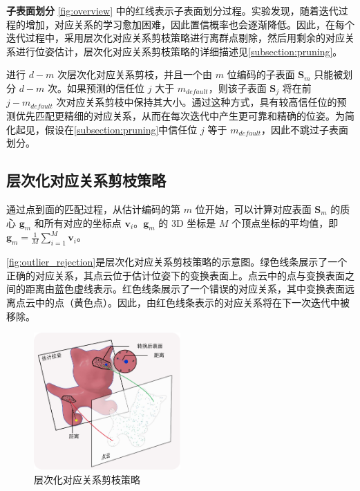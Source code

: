 \textbf{子表面划分} \autoref{fig:overview} 中的红线表示子表面划分过程。实验发现，随着迭代过程的增加，对应关系的学习愈加困难，因此置信概率也会逐渐降低。因此，在每个迭代过程中，采用层次化对应关系剪枝策略进行离群点剔除，然后用剩余的对应关系进行位姿估计，层次化对应关系剪枝策略的详细描述见\autoref{subsection:pruning}。

进行 $d - m$ 次层次化对应关系剪枝，并且一个由 $m$ 位编码的子表面 $\bm{S}_m$ 只能被划分 $d - m$ 次。如果预测的信任位 $j$ 大于 $m_{default}$，则该子表面 $\bm{S}_j$ 将在前 $j - m_{default}$ 次对应关系剪枝中保持其大小。通过这种方式，具有较高信任位的预测优先匹配更精细的对应关系，从而在每次迭代中产生更可靠和精确的位姿。为简化起见，假设在\autoref{subsection:pruning}中信任位 $j$ 等于 $m_{default}$，因此不跳过子表面划分。

\subsection{层次化对应关系剪枝策略}\label{subsection:pruning}

通过点到面的匹配过程，从估计编码的第 $m$ 位开始，可以计算对应表面 $\bm{S}_{m}$ 的质心 $\bm{g}_{m}$ 和所有对应的坐标点 $\bm{v}_i$。$\bm{g}_{m}$ 的 3D 坐标是 $M$ 个顶点坐标的平均值，即 $\bm{g}_m = \frac{1}{M}\sum_{i=1}^{M}\bm{v}_i$。


\autoref{fig:outlier_rejection}是层次化对应关系剪枝策略的示意图。绿色线条展示了一个正确的对应关系，其点云位于估计位姿下的变换表面上。点云中的点与变换表面之间的距离由蓝色虚线表示。红色线条展示了一个错误的对应关系，其中变换表面远离点云中的点（黄色点）。因此，由红色线条表示的对应关系将在下一次迭代中被移除。

\begin{figure}[htbp]
    \centering
    \includegraphics[width=0.5\textwidth]{figure/hipose/outlier_rejection.pdf}
    \caption{层次化对应关系剪枝策略}
    \label{fig:outlier_rejection}
\end{figure}

